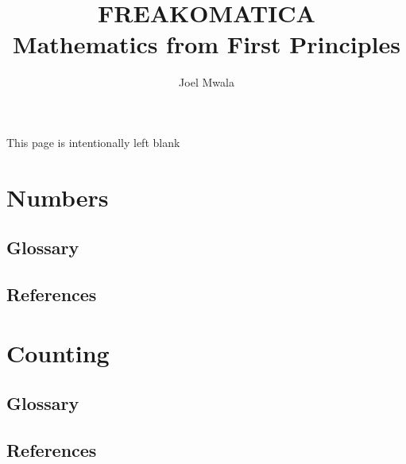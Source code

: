 \documentclass[12pt]{book}
\title{FREAKOMATICA \\\huge{Mathematics from First Principles}}
\author{Joel Mwala}
\begin{document}
\frontmatter
\maketitle
\newpage
\begin{center}
    This page is intentionally left blank
\end{center}

\newpage





\tableofcontents
\newpage





\mainmatter


\chapter{Numbers}%
\section{Glossary}
\section{References}
\newpage



\chapter{Counting}%
\section{Glossary}
\section{References}
\newpage
\end{document}

